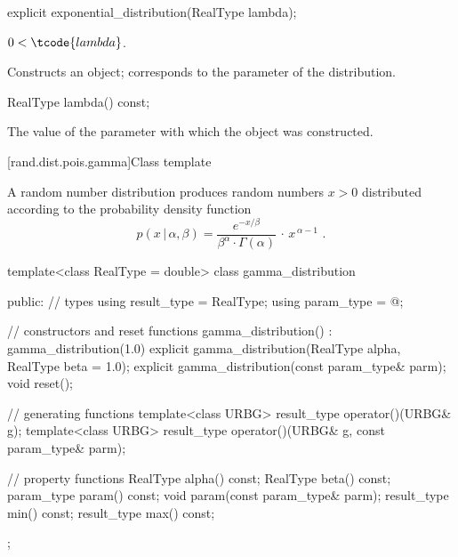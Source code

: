 %
\begin{itemdecl}
explicit exponential_distribution(RealType lambda);
\end{itemdecl}

\begin{itemdescr}
\pnum
\requires $0 < \tcode{lambda}$.

\pnum
\effects Constructs an  object;
 corresponds to the parameter of the distribution.
\end{itemdescr}

%
\begin{itemdecl}
RealType lambda() const;
\end{itemdecl}

\begin{itemdescr}
\pnum\returns The value of the  parameter
 with which the object was constructed.
\end{itemdescr}


[rand.dist.pois.gamma]{Class template }%
%
%

\pnum
A  random number distribution
produces random numbers $x > 0$
distributed according to
the probability density function%
%
%
\[ p(x\,|\,\alpha,\beta) =
     \frac{e^{-x/\beta}}{\beta^{\alpha} \cdot \Gamma(\alpha)} \, \cdot \, x^{\, \alpha-1}
     \text{ .} \]

%
\begin{codeblock}
template<class RealType = double>
  class gamma_distribution {
  public:
    // types
    using result_type = RealType;
    using param_type  = @\unspec@;

    // constructors and reset functions
    gamma_distribution() : gamma_distribution(1.0) {}
    explicit gamma_distribution(RealType alpha, RealType beta = 1.0);
    explicit gamma_distribution(const param_type& parm);
    void reset();

    // generating functions
    template<class URBG>
      result_type operator()(URBG& g);
    template<class URBG>
      result_type operator()(URBG& g, const param_type& parm);

    // property functions
    RealType alpha() const;
    RealType beta() const;
    param_type param() const;
    void param(const param_type& parm);
    result_type min() const;
    result_type max() const;
  };
\end{codeblock}


